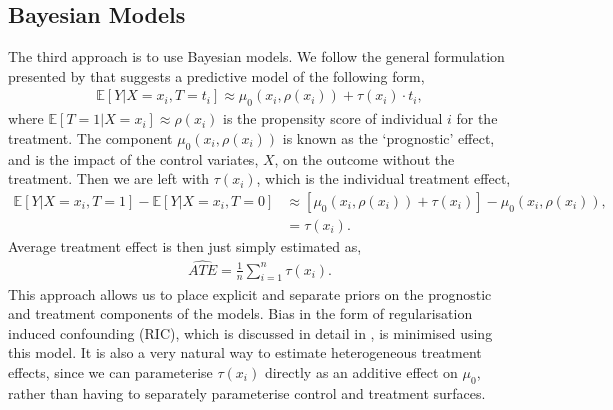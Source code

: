\documentclass[12pt, a4paper]{article}
\begin{document}
\subsection{Bayesian Models}

The third approach is to use Bayesian models. We follow the general formulation
presented by \cite{hahn2020} that suggests a predictive model of the following
form,
\begin{align}
  \mathbb{E}[Y|X{=}x_i, T{=}t_i] \approx \mu_0(x_i, \rho(x_i)) 
    + \tau(x_i)\cdot t_i, \label{eq:bayesmods}
\end{align}
where $\mathbb{E}[T=1|X{=}x_i] \approx \rho(x_i)$ is the propensity score of
individual $i$ for the treatment. The component $\mu_0(x_i, \rho(x_i))$ is
known as the `prognostic' effect, and is the impact of the control variates,
$X$, on the outcome without the treatment. Then we are left with $\tau(x_i)$,
which is the individual treatment effect,
\begin{align*}
  \mathbb{E}[Y|X{=}x_i, T{=}1] - \mathbb{E}[Y|X{=}x_i, T{=}0] &\approx 
    \left[\mu_0(x_i, \rho(x_i)) + \tau(x_i)\right] - \mu_0(x_i, \rho(x_i)), \\
    &=\tau(x_i).
\end{align*}
Average treatment effect is then just simply estimated as,
\begin{align*}
  \hat{ATE} = \frac{1}{n}\sum^n_{i=1} \tau(x_i).
\end{align*}
This approach allows us to place explicit and separate priors on the prognostic
and treatment components of the models. Bias in the form of regularisation
induced confounding (RIC), which is discussed in detail in \cite{hahn2018,
hahn2020}, is minimised using this model. It is also a very natural way to
estimate heterogeneous treatment effects, since we can parameterise $\tau(x_i)$
directly as an additive effect on $\mu_0$, rather than having to separately
parameterise control and treatment surfaces.
\end{document}

